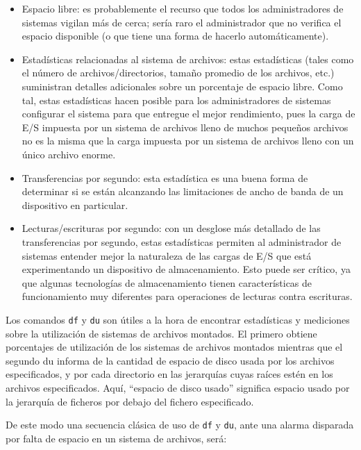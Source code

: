 \documentclass[12pt]{article}
\begin{document}
\begin{itemize}
\item Espacio libre: es probablemente el recurso que todos los 
administradores de sistemas vigilan más de cerca; sería raro el 
administrador que no verifica el espacio disponible (o que tiene una 
forma de hacerlo automáticamente).

\item Estadísticas relacionadas al sistema de archivos: estas estadísticas
 (tales como el número de archivos/directorios, tamaño promedio de los 
archivos, etc.) suministran detalles adicionales sobre un porcentaje de 
espacio libre. Como tal, estas estadísticas hacen posible para los 
administradores de sistemas configurar el sistema para que entregue el 
mejor rendimiento, pues la carga de E/S impuesta por un sistema de 
archivos lleno de muchos pequeños archivos no es la misma que la carga 
impuesta por un sistema de archivos lleno con un único archivo enorme.

\item Transferencias por segundo: esta estadística es una buena forma de 
determinar si se están alcanzando las limitaciones de ancho de banda de 
un dispositivo en particular.

\item Lecturas/escrituras por segundo: con un desglose más detallado de 
las transferencias por segundo, estas estadísticas permiten al 
administrador de sistemas entender mejor la naturaleza de las cargas de 
E/S que está experimentando un dispositivo de almacenamiento. Esto puede 
ser crítico, ya que algunas tecnologías de almacenamiento tienen 
características de funcionamiento muy diferentes para operaciones de 
lecturas contra escrituras.
\end{itemize}

Los comandos \texttt{df} y \texttt{du} son útiles a la hora de encontrar 
estadísticas y mediciones sobre la utilización de sistemas de archivos 
montados. El primero obtiene porcentajes de utilización de los sistemas 
de archivos montados mientras que el segundo du  informa  de  la cantidad 
de espacio de disco usada por los archivos especificados, y por cada 
directorio en  las  jerarquías  cuyas  raíces estén  en  los  archivos 
especificados.  Aquí, ``espacio de disco usado'' significa espacio usado 
por la jerarquía de  ficheros  por  debajo  del fichero especificado. 

De este modo una secuencia clásica de uso de {\tt df} y {\tt du}, ante
una alarma disparada por falta de espacio en un sistema de archivos, será:
\end{document}
